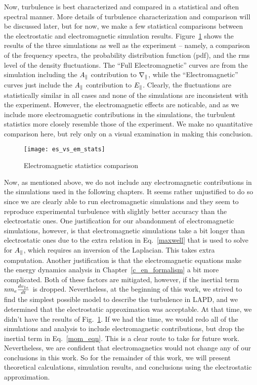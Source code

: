 Now, turbulence is best characterized and compared in a statistical and often spectral manner. 
More details of turbulence characterization and comparison will be discussed later, but for now, we make a few statistical comparisons between the electrostatic and electromagnetic simulation results.
Figure~\ref{es_vs_em_stats} shows the results of the three simulations as well as the experiment
 -- namely, a comparison of the frequency spectra, the probability distribution function (pdf), and the rms level of the density fluctuations. 
The ``Full Electromagnetic'' curves are from the simulation including the $A_\parallel$ contribution to $\nabla_\parallel$, while the ``Electromagnetic'' curves
just include the $A_\parallel$ contribution to $E_\parallel$. 
Clearly, the fluctuations are statistically similar in all cases and none of the simulations are inconsistent with the experiment. 
However, the electromagnetic effects are noticable, and as we include more electromagnetic contributions in the simulations, the turbulent statistics more closely resemble those of the experiment.
We make no quantitative comparison here, but rely only on a visual examination in making this conclusion.

\begin{figure}[ht!]
\texttt{[image: es\_vs\_em\_stats]}
\centering
\caption{Electromagnetic statistics comparison}
\label{es_vs_em_stats}
\end{figure}

Now, as mentioned above, we do not include any electromagnetic contributions in the simulations used in the following chapters. 
It seems rather unjustified to do so since we are clearly able to run electromagnetic simulations and they seem to reproduce experimental turbulence with slightly better accuracy 
than the electrostatic ones.
One justification for our abandonment of electromagnetic simulations, however, is that electromagnetic simulations take a bit longer than electrostatic ones due to the extra relation in Eq.~\ref{maxwell} 
that is used to solve for $A_\parallel$, which requires an inversion of the Laplacian. This takes extra computation. 
Another justification is that the electromagnetic equations make the energy dynamics analysis in Chapter~\ref{c_en_formalism} a bit more complicated. Both of these factors are mitigated, 
however, if the inertial term $n m_e \frac{dv_{\parallel e}}{dt}$ is dropped. Nevertheless, at the beginning of this work, we strived to find the simplest possible model to describe the turbulence in LAPD,
and we determined that the electrostatic approximation was acceptable. At that time, we didn't have the results of Fig.~\ref{es_vs_em_stats}. If we had the time, we would redo all of the simulations
and analysis to include electromagnetic contributions, but drop the inertial term in Eq.~\ref{mom_eqn}. This is a clear route to take for future work. 
Nevertheless, we are confident that electromagnetics would not change any of our conclusions in this work.
So for the remainder of this work, we will present theoretical calculations, simulation results, and conclusions using the electrostatic approximation.
